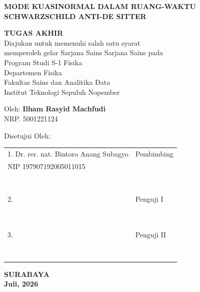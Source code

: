

\thispagestyle{empty}

\begin{center}
  \textbf{MODE KUASINORMAL DALAM RUANG-WAKTU SCHWARZSCHILD ANTI-DE SITTER}
\end{center}

\begingroup
\small

\begin{center}
  \textbf{TUGAS AKHIR} \\
  Diajukan untuk memenuhi salah satu syarat \\
  memperoleh gelar Sarjana Sains
  Sarjana Sains pada \\
  Program Studi S-1 Fisika \\
  Departemen Fisika \\
  Fakultas Sains dan Analitika Data \\
  Institut Teknologi Sepuluh Nopember
\end{center}

\begin{center}
  Oleh: \textbf{Ilham Rasyid Machfudi} \\
  NRP. 5001221124
  
\end{center}

\begin{center}
  Disetujui Oleh:
\end{center}

\vspace{8ex}

\begingroup
\setlength{\tabcolsep}{0pt}

\noindent
\begin{tabularx}{\textwidth}{X l}
  1. Dr. rer. nat. Bintoro Anang Subagyo      & Pembimbing \\
  NIP 197907192005011015        &  \\
  &  \\
  & \dotfill \\\
  &  \\
  &  \\
  2. \dotfill   & Penguji I \\
  & \\
  &  \\
  & \dotfill \\\
  &  \\
  &  \\
  3. \dotfill   & Penguji II \\
  &  \\
  &  \\
  & \dotfill \\\
\end{tabularx}
\endgroup

\vspace{\fill}

\begin{center}
  \textbf{SURABAYA} \\
  \textbf{Juli, 2026}
\end{center}
\endgroup